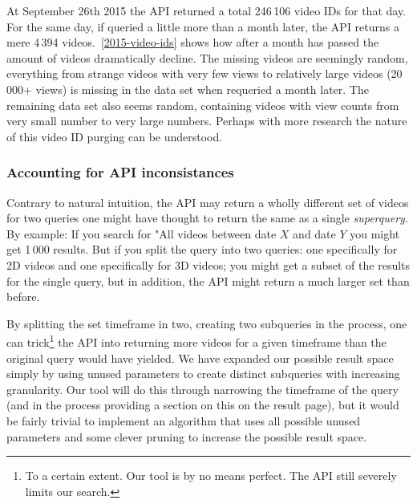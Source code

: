 At September 26th 2015 the API returned a total 246\,106 video IDs for that day.
For the same day, if queried a little more than a month later, the API returns
a mere 4\,394 videos.~\cref{2015-video-ids} shows how after a month has passed 
the amount of videos dramatically decline. The missing videos are seemingly 
random, everything from strange videos with very few views to relatively large 
videos (20\,000+ views) is missing in the data set when requeried a month later. 
The remaining data set also seems random, containing videos with view counts 
from very small number to very large numbers. Perhaps with more research the
nature of this video ID purging can be understood.

\subsubsection{Accounting for API inconsistances}
Contrary to natural intuition, the API may return a wholly different set of
videos for two queries one might have thought to return the same as a single
\textit{superquery}. By example: If you search for "All videos between date
$X$ and date $Y$ you might get 1\,000 results. But if you split the query into
two queries: one specifically for 2D videos and one specifically for 3D videos;
you might get a subset of the results for the single query, but in addition,
the API might return a much larger set than before.

By splitting the set timeframe in two, creating two subqueries in the process,
one can trick\footnote{To a certain extent. Our tool is by no means perfect. The
API still severely limits our search.} the API into returning more videos for a given
timeframe than the original query would have yielded. We have expanded our
possible result space simply by using unused parameters to create distinct
subqueries with increasing granularity.
Our tool will do this through narrowing the timeframe of the query (and
in the process providing a section on this on the result page), but
it would be fairly trivial to implement an algorithm that uses all possible
unused parameters and some clever pruning to increase the possible result space.

